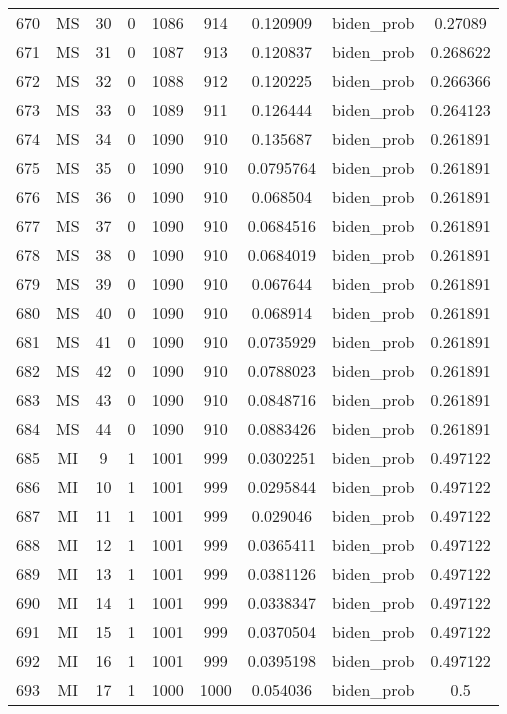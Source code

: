 \documentclass[12pt,a4paper]{article}
\begin{document}
\begin{tabular}{r|cccccccc}
	670 & MS & 30 & 0 & 1086 & 914 & 0.120909 & biden\_prob & 0.27089 \\
	671 & MS & 31 & 0 & 1087 & 913 & 0.120837 & biden\_prob & 0.268622 \\
	672 & MS & 32 & 0 & 1088 & 912 & 0.120225 & biden\_prob & 0.266366 \\
	673 & MS & 33 & 0 & 1089 & 911 & 0.126444 & biden\_prob & 0.264123 \\
	674 & MS & 34 & 0 & 1090 & 910 & 0.135687 & biden\_prob & 0.261891 \\
	675 & MS & 35 & 0 & 1090 & 910 & 0.0795764 & biden\_prob & 0.261891 \\
	676 & MS & 36 & 0 & 1090 & 910 & 0.068504 & biden\_prob & 0.261891 \\
	677 & MS & 37 & 0 & 1090 & 910 & 0.0684516 & biden\_prob & 0.261891 \\
	678 & MS & 38 & 0 & 1090 & 910 & 0.0684019 & biden\_prob & 0.261891 \\
	679 & MS & 39 & 0 & 1090 & 910 & 0.067644 & biden\_prob & 0.261891 \\
	680 & MS & 40 & 0 & 1090 & 910 & 0.068914 & biden\_prob & 0.261891 \\
	681 & MS & 41 & 0 & 1090 & 910 & 0.0735929 & biden\_prob & 0.261891 \\
	682 & MS & 42 & 0 & 1090 & 910 & 0.0788023 & biden\_prob & 0.261891 \\
	683 & MS & 43 & 0 & 1090 & 910 & 0.0848716 & biden\_prob & 0.261891 \\
	684 & MS & 44 & 0 & 1090 & 910 & 0.0883426 & biden\_prob & 0.261891 \\
	685 & MI & 9 & 1 & 1001 & 999 & 0.0302251 & biden\_prob & 0.497122 \\
	686 & MI & 10 & 1 & 1001 & 999 & 0.0295844 & biden\_prob & 0.497122 \\
	687 & MI & 11 & 1 & 1001 & 999 & 0.029046 & biden\_prob & 0.497122 \\
	688 & MI & 12 & 1 & 1001 & 999 & 0.0365411 & biden\_prob & 0.497122 \\
	689 & MI & 13 & 1 & 1001 & 999 & 0.0381126 & biden\_prob & 0.497122 \\
	690 & MI & 14 & 1 & 1001 & 999 & 0.0338347 & biden\_prob & 0.497122 \\
	691 & MI & 15 & 1 & 1001 & 999 & 0.0370504 & biden\_prob & 0.497122 \\
	692 & MI & 16 & 1 & 1001 & 999 & 0.0395198 & biden\_prob & 0.497122 \\
	693 & MI & 17 & 1 & 1000 & 1000 & 0.054036 & biden\_prob & 0.5 \\

\end{tabular}
\end{document}
